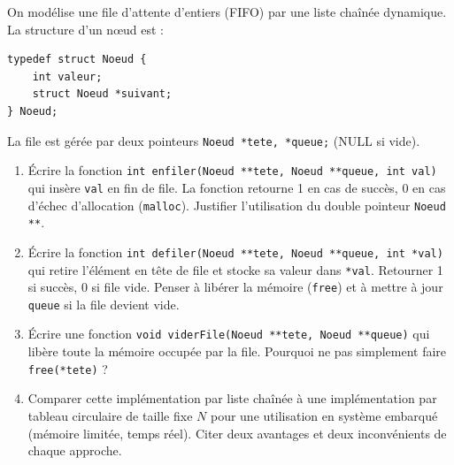 \documentclass[11pt]{article}
\begin{document}
\begin{exercice}
On modélise une file d'attente d'entiers (FIFO) par une liste chaînée dynamique. La structure d'un nœud est :
\begin{verbatim}
typedef struct Noeud {
    int valeur;
    struct Noeud *suivant;
} Noeud;
\end{verbatim}
La file est gérée par deux pointeurs \texttt{Noeud *tete, *queue;} (NULL si vide).

\begin{enumerate}
    \item Écrire la fonction \texttt{int enfiler(Noeud **tete, Noeud **queue, int val)} qui insère \texttt{val} en fin de file. La fonction retourne 1 en cas de succès, 0 en cas d'échec d'allocation (\texttt{malloc}). Justifier l'utilisation du double pointeur \texttt{Noeud **}.
    \item Écrire la fonction \texttt{int defiler(Noeud **tete, Noeud **queue, int *val)} qui retire l'élément en tête de file et stocke sa valeur dans \texttt{*val}. Retourner 1 si succès, 0 si file vide. Penser à libérer la mémoire (\texttt{free}) et à mettre à jour \texttt{queue} si la file devient vide.
    \item Écrire une fonction \texttt{void viderFile(Noeud **tete, Noeud **queue)} qui libère toute la mémoire occupée par la file. Pourquoi ne pas simplement faire \texttt{free(*tete)} ?
    \item Comparer cette implémentation par liste chaînée à une implémentation par tableau circulaire de taille fixe $N$ pour une utilisation en système embarqué (mémoire limitée, temps réel). Citer deux avantages et deux inconvénients de chaque approche.
\end{enumerate}
\end{exercice}
\end{document}
